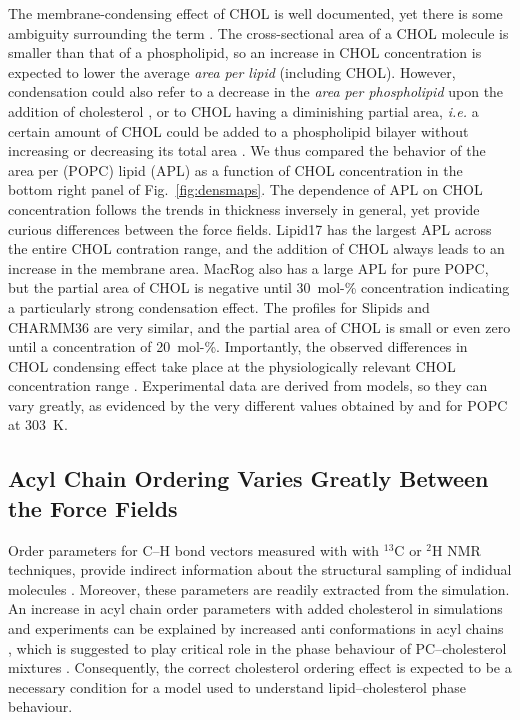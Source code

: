 \documentclass[aps,prl,superscriptaddress]{revtex4-2}
\begin{document}
The membrane-condensing effect of CHOL is well documented, yet there is some ambiguity surrounding the term \cite{edholm2005areas}. The cross-sectional area of a CHOL molecule is smaller than that of a phospholipid, so an increase in CHOL concentration is expected to lower the average \emph{area per lipid} (including CHOL). However, condensation could also refer to a decrease in the \emph{area per phospholipid} upon the addition of cholesterol \cite{edholm2005areas}, or to CHOL having a diminishing partial area, \textit{i.e.} a certain amount of CHOL could be added to a phospholipid bilayer without increasing or decreasing its total area \cite{javanainen2017two}. We thus compared the behavior of the area per (POPC) lipid (APL) as a function of CHOL concentration in the bottom right panel of Fig.~\ref{fig:densmaps}. The dependence of APL on CHOL concentration follows the trends in thickness inversely in general, yet provide curious differences between the force fields. Lipid17 has the largest APL across the entire CHOL contration range, and the addition of CHOL always leads to an increase in the membrane area. MacRog also has a large APL for pure POPC, but the partial area of CHOL is negative until 30~mol-\% concentration indicating a particularly strong condensation effect. The profiles for Slipids and CHARMM36 are very similar, and the partial area of CHOL is small or even zero until a concentration of 20~mol-\%. Importantly, the observed differences in CHOL condensing effect take place at the physiologically relevant CHOL concentration range \cite{van2008membrane}. Experimental data are derived from models, so they can vary greatly, as evidenced by the very different values obtained by \citeauthor{pabst2000structural}\cite{pabst2000structural} and \citeauthor{kuvcerka2006structure}\cite{kuvcerka2006structure} for POPC at 303~K. 

\subsection{Acyl Chain Ordering Varies Greatly Between the Force Fields}

Order parameters for C--H bond vectors measured with with $^{13}$C or $^{2}$H NMR techniques, provide indirect information about the structural sampling of indidual molecules \cite{ollila16}. Moreover, these parameters are readily extracted from the simulation. An increase in acyl chain order parameters with added cholesterol in simulations and experiments can be explained by increased anti conformations in acyl chains \cite{ferreira13,??}, which is suggested to play critical role in the phase behaviour of PC--cholesterol mixtures \cite{ipsen87}. Consequently, the correct cholesterol ordering effect is expected to be a necessary condition for a model used to understand lipid--cholesterol phase behaviour.
\end{document}
